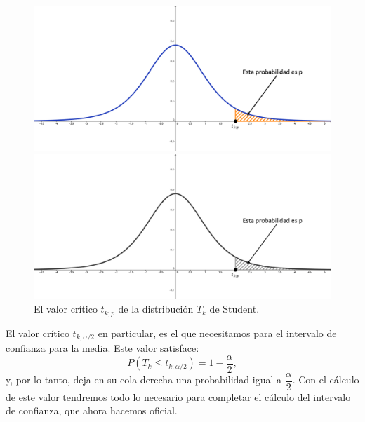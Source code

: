\begin{figure}[h!]
\begin{center}
\begin{enColor}
\includegraphics[width=13cm]{../fig/Cap06-ValoresCriticosT.png}
\end{enColor}
\begin{bn}
\includegraphics[width=13cm]{../fig/Cap06-ValoresCriticosT-bn.png}
\end{bn}
\caption{El valor crítico $t_{k;p}$ de la distribución $T_k$ de Student.}
\label{cap06:fig:ValorCriticoT}
\end{center}
\end{figure}

El valor crítico $t_{k;\alpha/2}$ en particular, es el que necesitamos para el
intervalo de confianza para la media. Este valor satisface:
    \[P\left(T_k\leq t_{k;\alpha/2}\right)=1-\dfrac{\alpha}{2},\]
y, por lo tanto, deja en su cola derecha una probabilidad igual a
$\dfrac{\alpha}{2}$. Con el cálculo de este valor tendremos todo lo necesario
para completar el cálculo del intervalo de confianza, que ahora hacemos
oficial.

